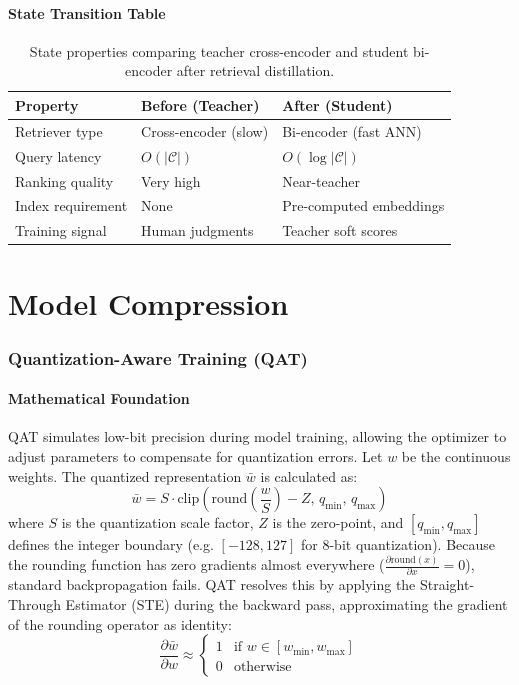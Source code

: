 \subsection{State Transition Table}
\begin{table}[h]\centering
\begin{tabular}{lll}\toprule
\textbf{Property} & \textbf{Before (Teacher)} & \textbf{After (Student)}\\\midrule
Retriever type & Cross-encoder (slow) & Bi-encoder (fast ANN)\\
Query latency & $O(|\mathcal{C}|)$ & $O(\log|\mathcal{C}|)$\\
Ranking quality & Very high & Near-teacher\\
Index requirement & None & Pre-computed embeddings\\
Training signal & Human judgments & Teacher soft scores\\\bottomrule
\end{tabular}
\caption{State properties comparing teacher cross-encoder and student bi-encoder after retrieval distillation.}
\end{table}

\newpage
\part{Model Compression}

\section{Quantization-Aware Training (QAT)}

\subsection{Mathematical Foundation}
QAT simulates low-bit precision during model training, allowing the optimizer to adjust parameters to compensate for quantization errors.
Let $w$ be the continuous weights. The quantized representation $\bar{w}$ is calculated as:
\begin{equation}
  \bar{w} = S \cdot \text{clip}\left( \text{round}\left( \frac{w}{S} \right) - Z, \, q_{\text{min}}, \, q_{\text{max}} \right)
\end{equation}
where $S$ is the quantization scale factor, $Z$ is the zero-point, and $[q_{\text{min}}, q_{\text{max}}]$ defines the integer boundary (e.g. $[-128, 127]$ for 8-bit quantization).
Because the rounding function has zero gradients almost everywhere ($\frac{\partial \text{round}(x)}{\partial x} = 0$), standard backpropagation fails. QAT resolves this by applying the Straight-Through Estimator (STE) during the backward pass, approximating the gradient of the rounding operator as identity:
\begin{equation}
  \frac{\partial \bar{w}}{\partial w} \approx \begin{cases} 1 & \text{if } w \in [w_{\text{min}}, w_{\text{max}}] \\ 0 & \text{otherwise} \end{cases}
\end{equation}

